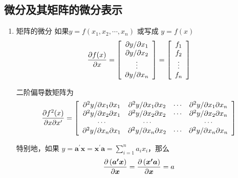 \subsection{微分及其矩阵的微分表示}
\begin{enumerate} [1、]
	\item 矩阵的微分
		\setlength{\parindent}{2\ccwd}
		如果$ y=f\left(x_{1}, x_{2}, \cdots, x_{n}\right) $ 或写成 $ y=f(x) $
		\begin{eqnarray}
		\begin{array}{c}
		\dfrac{\partial f(x)}{\partial x} = \left[\begin{array}{c}
		\partial y / \partial x_{1} \\
		\partial y / \partial x_{2} \\
		\vdots \\
		\partial y / \partial x_{n}
		\end{array}\right] = \left[\begin{array}{c}
		f_{1} \\
		f_{2} \\
		\vdots \\
		f_{n}
		\end{array}\right]
		\end{array} \notag
		\end{eqnarray}
		
		二阶偏导数矩阵为
		\begin{eqnarray}
		\frac{\partial f^{2}(x)}{\partial x \partial x^{\prime}}  =  \left[\begin{array}{cccc}
		\partial^{2} y / \partial x_{1} \partial x_{1} & \partial^{2} y / \partial x_{1} \partial x_{2} & \cdots & \partial^{2} y / \partial x_{1} \partial x_{n} \\
		\partial^{2} y / \partial x_{2} \partial x_{1} & \partial^{2} y / \partial x_{2} \partial x_{2} & \cdots & \partial^{2} y / \partial x_{2} \partial x_{n} \\
		\cdots & \cdots & & \cdots \\
		\partial^{2} y / \partial x_{n} \partial x_{1} & \partial^{2} y / \partial x_{n} \partial x_{2} & \cdots & \partial^{2} y / \partial x_{n} \partial x_{n}
		\end{array}\right] \notag
		\end{eqnarray}
		
		特别地，如果 $ y = \boldsymbol{ a^{\prime} x=x^{\prime} a }=\sum_{i=1}^{n} a_{i} x_{i} $，那么
		\begin{eqnarray}
		\frac{\partial \left( \boldsymbol{ a^{\prime} x } \right) }{ \partial \boldsymbol{x} }  =  
		\frac{\partial \left( \boldsymbol{ x^{\prime} a } \right) }{ \partial \boldsymbol{x} }  =  a \notag
		\end{eqnarray} 
		 

\end{enumerate}
